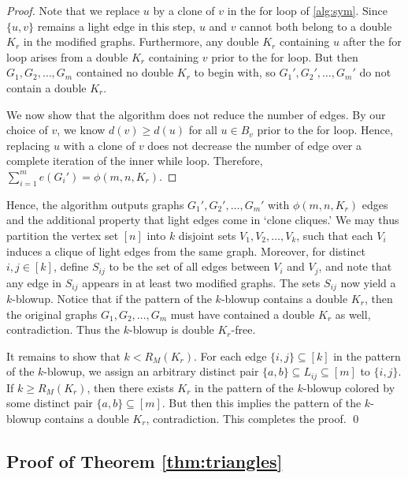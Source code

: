 \documentclass[12pt]{article}
\begin{document}
  \begin{proof}
    Note that we replace $u$ by a clone of $v$ in the for loop of \cref{alg:sym}. Since $\{u, v\}$ remains a light edge in this step, $u$ and $v$ cannot both belong to a double $K_r$ in the modified graphs. Furthermore, any double $K_r$ containing $u$ after the for loop arises from a double $K_r$ containing $v$ prior to the for loop. But then $G_1, G_2, \ldots, G_m$ contained no double $K_r$ to begin with, so $G_1', G_2', \ldots, G_m'$ do not contain a double $K_r$.

    We now show that the algorithm does not reduce the number of edges. By our choice of $v$, we know $d(v) \geq d(u)$ for all $u \in B_v$ prior to the for loop. Hence, replacing $u$ with a clone of $v$ does not decrease the number of edge over a complete iteration of the inner while loop. Therefore, $\sum_{i = 1}^m e(G_i') = \phi(m, n, K_r)$. 
  \end{proof}

  Hence, the algorithm outputs graphs $G_1', G_2', \ldots, G_m'$ with $\phi(m, n, K_r)$ edges and the additional property that light edges come in `clone cliques.' We may thus partition the vertex set $[n]$ into $k$ disjoint sets $V_1, V_2, \ldots, V_k$, such that each $V_i$ induces a clique of light edges from the same graph. Moreover, for distinct $i, j \in [k]$, define $S_{ij}$ to be the set of all edges between $V_i$ and $V_j$, and note that any edge in $S_{ij}$ appears in at least two modified graphs. The sets $S_{ij}$ now yield a $k$-blowup. Notice that if the pattern of the $k$-blowup contains a double $K_r$, then the original graphs $G_1, G_2, \ldots, G_m$ must have contained a double $K_r$ as well, contradiction. Thus the $k$-blowup is double $K_r$-free. 

  It remains to show that $k < R_M(K_r)$. For each edge $\{i, j\} \subseteq [k]$ in the pattern of the $k$-blowup, we assign an arbitrary distinct pair $\{a, b\} \subseteq L_{ij} \subseteq [m]$ to $\{i, j\}$. If $k \geq R_M(K_r)$, then there exists $K_r$ in the pattern of the $k$-blowup colored by some distinct pair $\{a, b\} \subseteq [m]$. But then this implies the pattern of the $k$-blowup contains a double $K_r$, contradiction. This completes the proof. \qed

\subsection{Proof of Theorem \ref{thm:triangles}}
\end{document}

